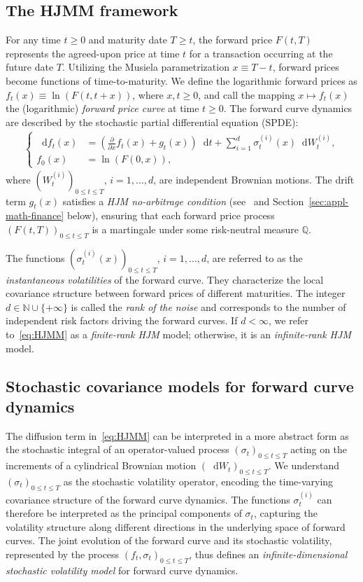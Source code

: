 \documentclass[10pt,a4paper,reqno]{amsart}
\newcommand*\D{\mathop{}\!\mathrm{d}}
\numberwithin{equation}{section}
\theoremstyle{plain}
\theoremstyle{definition}
\theoremstyle{example}
\newcommand{\MQ}{\mathbb{Q}}
\begin{document}
\subsection{The HJMM framework}
For any time $t \geq 0$ and maturity date $T \geq t$, the forward price $F(t,T)$ represents the agreed-upon price at time $t$ for a transaction occurring at the future date $T$. Utilizing the Musiela parametrization $x \equiv T - t$, forward prices become functions of time-to-maturity. We define the logarithmic forward prices as $f_{t}(x)\equiv \ln(F(t,t+x))$, where $x,t\geq 0$, and call the mapping $x \mapsto f_t(x)$ the (logarithmic) \emph{forward price curve} at time $t \geq 0$. The forward curve dynamics are described by the stochastic partial differential equation (SPDE):
\begin{align}\label{eq:HJMM}
\begin{cases}
\D f_t(x) &= \left(\frac{\partial}{\partial x}f_t(x) + g_t(x)\right)\D t + \sum_{i=1}^{d}\sigma_t^{(i)}(x)\D W_t^{(i)},\\
f_0(x) &= \ln(F(0,x)),
\end{cases}
\end{align}
where $(W^{(i)}_t)_{0 \leq t \leq T}$, ${i=1}, \ldots, {d}$, are independent Brownian motions. The
drift term $g_t(x)$ satisfies a \emph{HJM no-arbitrage condition} (see~\cite[Sec.~2.4]{CT06} and
Section~\ref{sec:appl-math-finance} below), ensuring that each forward price process $(F(t,T))_{0 \leq t \leq T}$ is a martingale under some risk-neutral measure $\MQ$. 

The functions $(\sigma_t^{(i)}(x))_{0 \leq t \leq T}$, ${i=1}, \ldots, {d}$, are referred to as the \textit{instantaneous volatilities} of the forward curve. They characterize the local covariance structure between forward prices of different maturities. The integer $d \in \mathbb{N} \cup \{+\infty\}$ is called the \emph{rank of the noise} and corresponds to the number of independent risk factors driving the forward curves. If $d < \infty$, we refer to~\eqref{eq:HJMM} as a \emph{finite-rank HJM} model; otherwise, it is an \emph{infinite-rank HJM} model. 

\subsection{Stochastic covariance models for forward curve dynamics}

The diffusion term in~\eqref{eq:HJMM} can be interpreted in a more abstract form as the stochastic integral of an operator-valued process $(\sigma_t)_{0\leq t \leq T}$ acting on the increments of a cylindrical Brownian motion $(\D W_t)_{0\leq t \leq T}$. We understand $(\sigma_t)_{0\leq t \leq T}$ as the stochastic volatility operator, encoding the time-varying covariance structure of the forward curve dynamics. The functions $\sigma_t^{(i)}$ can therefore be interpreted as the principal components of $\sigma_t$, capturing the volatility structure along different directions in the underlying space of forward curves. The joint evolution of the forward curve and its stochastic volatility, represented by the process $(f_t, \sigma_t)_{0\leq t \leq T}$, thus defines an \emph{infinite-dimensional stochastic volatility model} for forward curve dynamics.
\end{document}
